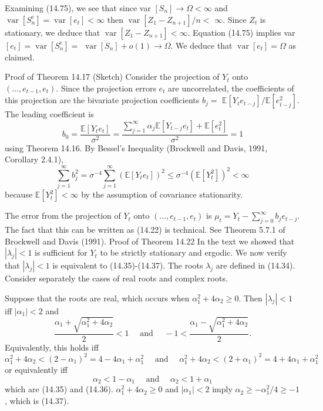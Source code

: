 \documentclass[10pt]{article}
\begin{document}
Examining (14.75), we see that since var $\left[S_{n}\right] \rightarrow \Omega<\infty$ and $\operatorname{var}\left[S_{n}^{e}\right]=\operatorname{var}\left[e_{t}\right]<\infty$ then $\operatorname{var}\left[Z_{1}-Z_{n+1}\right] / n<$ $\infty$. Since $Z_{t}$ is stationary, we deduce that $\operatorname{var}\left[Z_{1}-Z_{n+1}\right]<\infty$. Equation (14.75) implies var $\left[e_{t}\right]=\operatorname{var}\left[S_{n}^{e}\right]=$ $\operatorname{var}\left[S_{n}\right]+o(1) \rightarrow \Omega$. We deduce that $\operatorname{var}\left[e_{t}\right]=\Omega$ as claimed.

Proof of Theorem 14.17 (Sketch) Consider the projection of $Y_{t}$ onto $\left(\ldots, e_{t-1}, e_{t}\right)$. Since the projection errors $e_{t}$ are uncorrelated, the coefficients of this projection are the bivariate projection coefficients $b_{j}=$ $\mathbb{E}\left[Y_{t} e_{t-j}\right] / \mathbb{E}\left[e_{t-j}^{2}\right]$. The leading coefficient is
$$
b_{0}=\frac{\mathbb{E}\left[Y_{t} e_{t}\right]}{\sigma^{2}}=\frac{\sum_{j=1}^{\infty} \alpha_{j} \mathbb{E}\left[Y_{t-j} e_{t}\right]+\mathbb{E}\left[e_{t}^{2}\right]}{\sigma^{2}}=1
$$
using Theorem 14.16. By Bessel's Inequality (Brockwell and Davis, 1991, Corollary 2.4.1),
$$
\sum_{j=1}^{\infty} b_{j}^{2}=\sigma^{-4} \sum_{j=1}^{\infty}\left(\mathbb{E}\left[Y_{t} e_{t}\right]\right)^{2} \leq \sigma^{-4}\left(\mathbb{E}\left[Y_{t}^{2}\right]\right)^{2}<\infty
$$
because $\mathbb{E}\left[Y_{t}^{2}\right]<\infty$ by the assumption of covariance stationarity.

The error from the projection of $Y_{t}$ onto $\left(\ldots, e_{t-1}, e_{t}\right)$ is $\mu_{t}=Y_{t}-\sum_{j=0}^{\infty} b_{j} e_{t-j}$. The fact that this can be written as (14.22) is technical. See Theorem 5.7.1 of Brockwell and Davis (1991). Proof of Theorem 14.22 In the text we showed that $\left|\lambda_{j}\right|<1$ is sufficient for $Y_{t}$ to be strictly stationary and ergodic. We now verify that $\left|\lambda_{j}\right|<1$ is equivalent to (14.35)-(14.37). The roots $\lambda_{j}$ are defined in (14.34). Consider separately the cases of real roots and complex roots.

Suppose that the roots are real, which occurs when $\alpha_{1}^{2}+4 \alpha_{2} \geq 0$. Then $\left|\lambda_{j}\right|<1$ iff $\left|\alpha_{1}\right|<2$ and
$$
\frac{\alpha_{1}+\sqrt{\alpha_{1}^{2}+4 \alpha_{2}}}{2}<1 \quad \text { and } \quad-1<\frac{\alpha_{1}-\sqrt{\alpha_{1}^{2}+4 \alpha_{2}}}{2} .
$$
Equivalently, this holds iff
$$
\alpha_{1}^{2}+4 \alpha_{2}<\left(2-\alpha_{1}\right)^{2}=4-4 \alpha_{1}+\alpha_{1}^{2} \quad \text { and } \quad \alpha_{1}^{2}+4 \alpha_{2}<\left(2+\alpha_{1}\right)^{2}=4+4 \alpha_{1}+\alpha_{1}^{2}
$$
or equivalently iff
$$
\alpha_{2}<1-\alpha_{1} \quad \text { and } \quad \alpha_{2}<1+\alpha_{1}
$$
which are (14.35) and (14.36). $\alpha_{1}^{2}+4 \alpha_{2} \geq 0$ and $\left|\alpha_{1}\right|<2$ imply $\alpha_{2} \geq-\alpha_{1}^{2} / 4 \geq-1$, which is (14.37).
\end{document}
